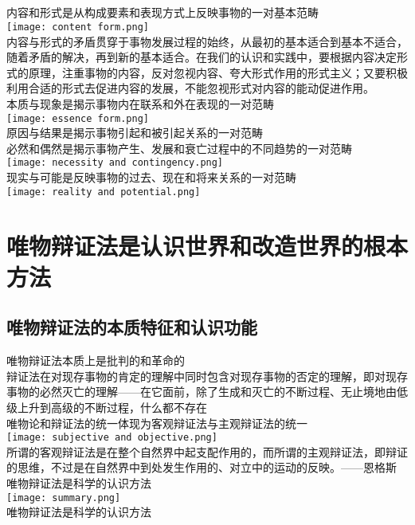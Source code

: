 \documentclass{article}
\begin{document}
		\subsection{}
			{\kaishu 内容和形式是从构成要素和表现方式上反映事物的一对基本范畴}\\
			\texttt{[image: content form.png]}\\
			{\kaishu 内容与形式的矛盾贯穿于事物发展过程的始终，从最初的基本适合到基本不适合，随着矛盾的解决，再到新的基本适合。在我们的认识和实践中，要根据内容决定形式的原理，注重事物的内容，反对忽视内容、夸大形式作用的形式主义；又要积极利用合适的形式去促进内容的发展，不能忽视形式对内容的能动促进作用。}\\
			{\kaishu 本质与现象是揭示事物内在联系和外在表现的一对范畴}\\
			\texttt{[image: essence form.png]}\\
			{\kaishu 原因与结果是揭示事物引起和被引起关系的一对范畴}\\
			{\kaishu 必然和偶然是揭示事物产生、发展和衰亡过程中的不同趋势的一对范畴}\\
			\texttt{[image: necessity and contingency.png]}\\
			{\kaishu 现实与可能是反映事物的过去、现在和将来关系的一对范畴}\\
			\texttt{[image: reality and potential.png]}\\
	\section{\kaishu 唯物辩证法是认识世界和改造世界的根本方法}
		\subsection{唯物辩证法的本质特征和认识功能}
			{\kaishu 唯物辩证法本质上是批判的和革命的}\\
			{\kaishu 辩证法在对现存事物的肯定的理解中同时包含对现存事物的否定的理解，即对现存事物的必然灭亡的理解——在它面前，除了生成和灭亡的不断过程、无止境地由低级上升到高级的不断过程，什么都不存在}\\
			{\kaishu 唯物论和辩证法的统一体现为客观辩证法与主观辩证法的统一}\\
			\texttt{[image: subjective and objective.png]}\\
			{\kaishu 所谓的客观辩证法是在整个自然界中起支配作用的，而所谓的主观辩证法，即辩证的思维，不过是在自然界中到处发生作用的、对立中的运动的反映。——恩格斯}\\
			{\kaishu 唯物辩证法是科学的认识方法}\\
			\texttt{[image: summary.png]}\\
			{\kaishu 唯物辩证法是科学的认识方法}
\end{document}
